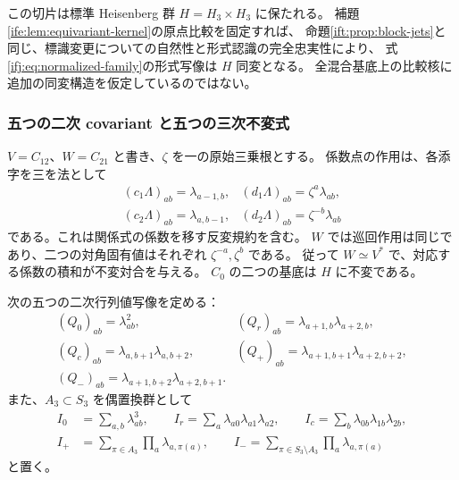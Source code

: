 この切片は標準 Heisenberg 群 $H=H_3\times H_3$ に保たれる。
補題\ref{ife:lem:equivariant-kernel}の原点比較を固定すれば、
命題\ref{ift:prop:block-jets}と同じ、標識変更についての自然性と形式認識の完全忠実性により、
式\eqref{ifj:eq:normalized-family}の形式写像は $H$ 同変となる。
全混合基底上の比較核に追加の同変構造を仮定しているのではない。

\subsubsection{五つの二次 covariant と五つの三次不変式}

$V=C_{12}$、$W=C_{21}$ と書き、$\zeta$ を一の原始三乗根とする。
係数点の作用は、各添字を三を法として
\begin{equation}\label{ifj:eq:parameter-actions}
 \begin{array}{ll}
 (c_1\Lambda)_{ab}=\lambda_{a-1,b},&
 (d_1\Lambda)_{ab}=\zeta^a\lambda_{ab},\\
 (c_2\Lambda)_{ab}=\lambda_{a,b-1},&
 (d_2\Lambda)_{ab}=\zeta^{-b}\lambda_{ab}
 \end{array}
\end{equation}
である。これは関係式の係数を移す反変規約を含む。
$W$ では巡回作用は同じであり、二つの対角固有値はそれぞれ $\zeta^{-a},\zeta^b$ である。
従って $W\simeq V^*$ で、対応する係数の積和が不変対合を与える。
$C_0$ の二つの基底は $H$ に不変である。

次の五つの二次行列値写像を定める：
\begin{equation}\label{ifj:eq:quadratic-basis}
 \begin{array}{ll}
 (Q_0)_{ab}=\lambda_{ab}^2,&
 (Q_r)_{ab}=\lambda_{a+1,b}\lambda_{a+2,b},\\
 (Q_c)_{ab}=\lambda_{a,b+1}\lambda_{a,b+2},&
 (Q_+)_{ab}=\lambda_{a+1,b+1}\lambda_{a+2,b+2},\\
 (Q_-)_{ab}=\lambda_{a+1,b+2}\lambda_{a+2,b+1}.&
 \end{array}
\end{equation}
また、$A_3\subset S_3$ を偶置換群として
\begin{equation}\label{ifj:eq:cubic-basis}
 \begin{split}
 I_0&=\sum_{a,b}\lambda_{ab}^3,\qquad
 I_r=\sum_a\lambda_{a0}\lambda_{a1}\lambda_{a2},\qquad
 I_c=\sum_b\lambda_{0b}\lambda_{1b}\lambda_{2b},\\
 I_+&=\sum_{\pi\in A_3}\prod_a\lambda_{a,\pi(a)},\qquad
 I_- =\sum_{\pi\in S_3\setminus A_3}\prod_a\lambda_{a,\pi(a)}
 \end{split}
\end{equation}
と置く。

